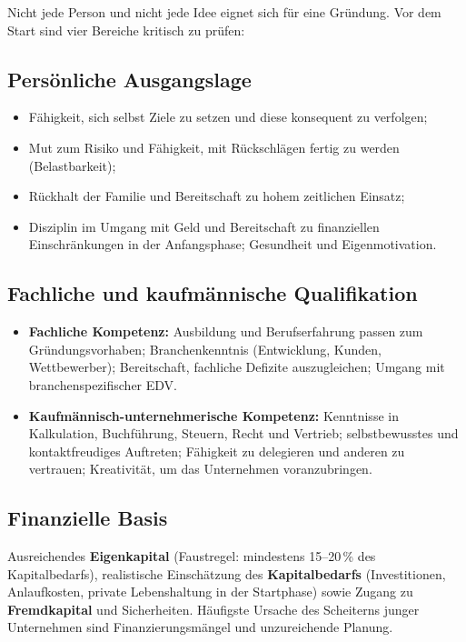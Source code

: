 \documentclass[11pt, a4paper]{article}
\begin{document}
Nicht jede Person und nicht jede Idee eignet sich für eine Gründung. Vor dem Start sind
vier Bereiche kritisch zu prüfen:

\subsection{Persönliche Ausgangslage}

\begin{itemize}
  \item Fähigkeit, sich selbst Ziele zu setzen und diese konsequent zu verfolgen;
  \item Mut zum Risiko und Fähigkeit, mit Rückschlägen fertig zu werden (Belastbarkeit);
  \item Rückhalt der Familie und Bereitschaft zu hohem zeitlichen Einsatz;
  \item Disziplin im Umgang mit Geld und Bereitschaft zu finanziellen Einschränkungen
    in der Anfangsphase; Gesundheit und Eigenmotivation.
\end{itemize}

\subsection{Fachliche und kaufmännische Qualifikation}

\begin{itemize}
  \item \textbf{Fachliche Kompetenz:} Ausbildung und Berufserfahrung passen zum
    Gründungsvorhaben; Branchenkenntnis (Entwicklung, Kunden, Wettbewerber); Bereitschaft,
    fachliche Defizite auszugleichen; Umgang mit branchenspezifischer EDV.
  \item \textbf{Kaufmännisch-unternehmerische Kompetenz:} Kenntnisse in Kalkulation,
    Buchführung, Steuern, Recht und Vertrieb; selbstbewusstes und kontaktfreudiges
    Auftreten; Fähigkeit zu delegieren und anderen zu vertrauen; Kreativität, um das
    Unternehmen voranzubringen.
\end{itemize}

\subsection{Finanzielle Basis}

Ausreichendes \textbf{Eigenkapital} (Faustregel: mindestens 15--20\,\% des
Kapitalbedarfs), realistische Einschätzung des \textbf{Kapitalbedarfs} (Investitionen,
Anlaufkosten, private Lebenshaltung in der Startphase) sowie Zugang zu
\textbf{Fremdkapital} und Sicherheiten. Häufigste Ursache des Scheiterns junger
Unternehmen sind Finanzierungsmängel und unzureichende Planung.
\end{document}
